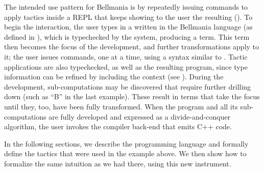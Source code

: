 \cbstart{}%
The intended use pattern for Bellmania is by repeatedly issuing
commands to apply tactics inside a REPL that keeps showing to the
user the resulting  ().
To begin the interaction, the user types in a  written
in the Bellmania language (as defined in ), which is typechecked
by the system, producing a term.
This term then becomes the focus of the development, and further transformations
apply to it; the user issues  commands, one at a time,
using a syntax similar to .
Tactic applications are also typechecked, as well as the resulting program,
since type information can be refined by including the context (see ).
During the development, sub-computations may be discovered that require
further drilling down (such as ``B'' in the last example).
These result in  terms that take the focus until they, too,
have been fully transformed.
When the program and all its sub-computations are fully developed and
expressed as a divide-and-conquer algorithm, the user invokes the compiler
back-end that emits C++ code.

In the following sections, we describe the programming language and
formally define the tactics that were used in the example above.
We then show how to formalize the same intuition as we had there,
using this new instrument.
\cbend
